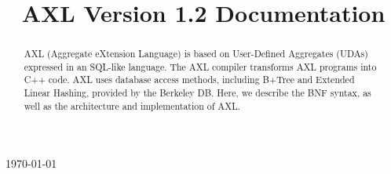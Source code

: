 \documentclass[11pt]{report}
\begin{document}
\setcounter{page}{1}


\title{
AXL Version 1.2 Documentation}
\today

\maketitle
\begin{abstract}
  AXL (Aggregate eXtension Language) is based on User-Defined
  Aggregates (UDAs) expressed in an SQL-like language.  The AXL
  compiler transforms AXL programs into C++ code. AXL uses database
  access methods, including B+Tree and Extended Linear Hashing,
  provided by the Berkeley DB. Here, we describe the BNF syntax, as
  well as the architecture and implementation of AXL.
\end{abstract} 






\end{document}
